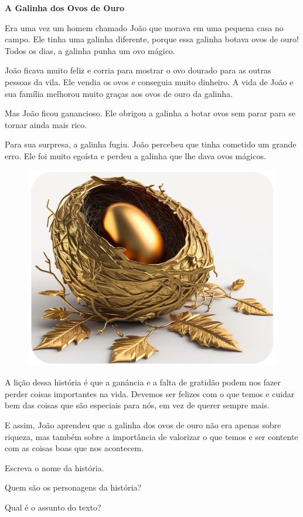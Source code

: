 \begin{myquote}
\textbf{A Galinha dos Ovos de Ouro}

Era uma vez um homem chamado João que morava em uma pequena casa no campo. Ele tinha uma galinha diferente, porque essa galinha botava ovos de ouro! Todos os dias, a galinha punha um ovo mágico.

João ficava muito feliz e corria para mostrar o ovo dourado para as outras pessoas da vila. Ele vendia os ovos e conseguia muito dinheiro. A vida de João e sua família melhorou muito graças aos ovos de ouro da galinha.

Mas João ficou ganancioso. Ele obrigou a galinha a botar ovos sem parar para se tornar ainda mais rico.

Para sua surpresa, a galinha fugiu. João percebeu que tinha cometido um grande erro. Ele foi muito egoísta e perdeu a galinha que lhe dava ovos mágicos.

\begin{figure}[H]
\centering
\includegraphics[width=.8\textwidth]{media/image191.png}
\end{figure}

A lição dessa história é que a ganância e a falta de gratidão podem nos fazer perder coisas importantes na vida. Devemos ser felizes com o que temos e cuidar bem das coisas que são especiais para nós, em vez de querer sempre mais.

E assim, João aprendeu que a galinha dos ovos de ouro não era apenas sobre riqueza, mas também sobre a importância de valorizar o que temos e ser contente com as coisas boas que nos acontecem.
\end{myquote}

\begin{escolha}
\item Escreva o nome da história.


\item Quem são os personagens da história?


\item Qual é o assunto do texto?

\end{escolha}

